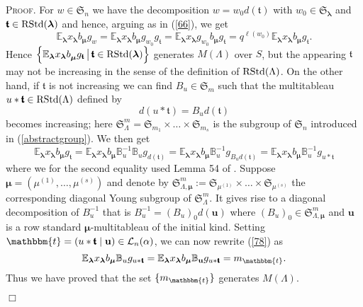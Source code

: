 \documentclass[10pt,a4,twoside,hidelinks,rm]{article}
\newcommand{\BB}{\mathbb{B}}
\newcommand\et{\mathbbm{t}}
\newcommand\bu{\mathbf{u}}
\newcommand{\bT}{\pmb{\mathfrak{t}}}
\newcommand{\Si}{\mathfrak{S}}
\newcommand{\rstd}{{\rm RStd}}
\newcommand\blambda{{\boldsymbol\lambda}}
\newcommand\be{\mathbb{E}}
\newcommand\bmu{{\boldsymbol\mu}}
\theoremstyle{plain}
\newenvironment{demo}
{\textsc{Proof.}} {\quad \hfill $\Box$}
\begin{document}
\begin{demo}
 For $ w \in \Si_n $ we have the decomposition
 $ w = w_0 d(\bT) $ with $ w_0 \in \Si_{\blambda}$ and $ \bT \in \rstd(\blambda) $ and hence,
 arguing as in (\ref{66}), we get 
\begin{equation}\label{77}
  \be_{\blambda} x_{\blambda} b_{\bmu} g_w =
  \be_{\blambda} x_{\blambda} b_{\bmu} g_{w_0} g_{\bT} =
  \be_{\blambda} x_{\blambda}g_{w_0} b_{\bmu}  g_{\bT} =
q^{\ell(w_0)}\be_{\blambda} x_{\blambda} b_{\bmu}  g_{\bT}.
\end{equation}  
Hence
$ \left\{  \be_{\blambda}x_{\blambda} b^{}_{\bmu}  g_{\bT}
\, \big| \, \bT \in \rstd(\blambda) \right\}$ generates $ M(\Lambda) $ over $S$, but 
the appearing $ \bT $ may not be increasing 
in the sense of the definition of $ \rstd(\Lambda) $.  On the other hand, if $ \bT $
is not increasing we can find 
$ B_u \in  \Si_m$
such that the multitableau
$ u \ast \bT  \in  \rstd(\Lambda) $ defined 
by
\begin{equation}\label{ast defi}
  d( u \ast \bT ) =    B_u d(\bT)
\end{equation}
becomes increasing; here $ \Si^m_{\Lambda}
= \Si_{m_1} \times \ldots \times \Si_{m_s} $ is the subgroup of 
$ \Si_n$ 
 introduced in (\ref{abstractgroup}). We then get
\begin{equation}\label{78}
  \be_{\blambda} x_{\blambda} b_{\bmu}  g_{\bT} =
  \be_{\blambda} x_{\blambda} b_{\bmu} \BB_u^{-1} \BB_u   g_{d(\bT)} =  
  \be_{\blambda} x_{\blambda} b_{\bmu} \BB_u^{-1}  g_{  B_u   d(\bT) } =
  \be_{\blambda} x_{\blambda} b_{\bmu} \BB_u^{-1} g_{   u \ast \bT }    
\end{equation}  
where we for the second equality used Lemma 54 of \cite{ER}.
Suppose $ \bmu = (\mu^{(1)}, \ldots, \mu^{(s)}) $ and denote by 
$ \Si^m_{\Lambda, \bmu} :=  \Si_{ \mu^{(1)} }\times \ldots \times \Si_{ \mu^{(s)} }$
the corresponding diagonal Young subgroup of  $ \Si^m_{\Lambda}$. It gives 
rise to a diagonal decomposition of $ B_u^{-1} $ that is $B_u^{-1}= (B_u)_0 d(\bu) $
where $ (B_u)_0 \in \Si^m_{\Lambda, \bmu} $
and $ \bu $ is a row standard $\bmu $-multitableau of the initial kind. 
Setting $ \et = ( u \ast \bT \mid \bu ) \in {\cal L}_n(\alpha)$, we can now rewrite (\ref{78}) as
\begin{equation}\label{79} 
  \be_{\blambda} x_{\blambda} b_{\bmu} \BB_u g_{   u \ast \bT }   =
  \be_{\blambda} x_{\blambda} b_{\bmu} \BB_{\bu} g_{   u \ast \bT }    = m_{\et}.
\end{equation}   
Thus we have proved that the set $ \{m_{\et}\}$ generates $ M(\Lambda) $.

\end{demo}
\end{document}
